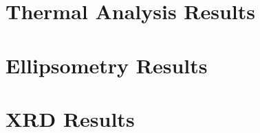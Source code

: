 
\section{Thermal Analysis Results}
\label{sup:Thermal-Results}



\section{Ellipsometry Results}
\label{sup:Ellipsometry}



\section{XRD Results}


